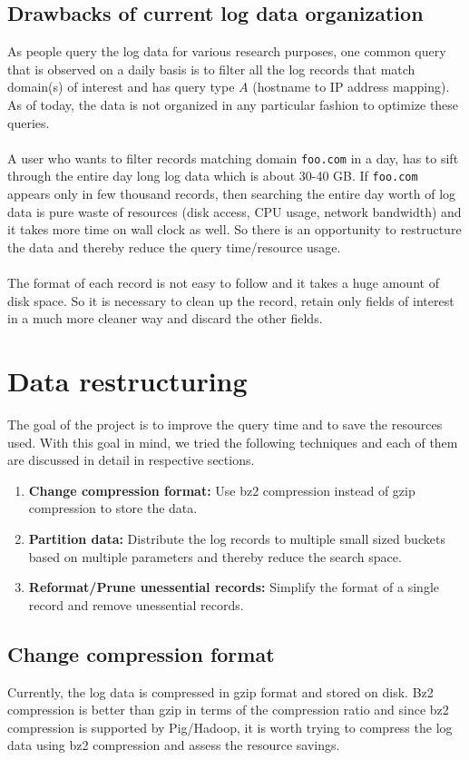\documentclass[11pt,a4paper]{article}
\newcommand{\resitem}[1]{\item #1 \vspace{-7pt}}
\begin{document}
\subsection{Drawbacks of current log data organization}
As people query the log data for various research purposes, one common query that is observed on a daily basis is to filter all the log records that match domain(s) of interest and has query type $A$ (hostname to IP address mapping). As of today, the data is not organized in any particular fashion to optimize these queries.
\\\\
A user who wants to filter records matching domain \texttt{foo.com} in a day, has to sift through the entire day long log data which is about 30-40 GB. If \texttt{foo.com} appears only in few thousand records, then searching the entire day worth of log data is pure waste of resources (disk access, CPU usage, network bandwidth) and it takes more time on wall clock as well. So there is an opportunity to restructure the data and thereby reduce the query time/resource usage.
\\\\
The format of each record is not easy to follow and it takes a huge amount of disk space. So it is necessary to clean up the record, retain only fields of interest in a much more cleaner way and discard the other fields.

\section {Data restructuring}
The goal of the project is to improve the query time and to save the resources used. With this goal in mind, we tried the following techniques and each of them are discussed in detail in respective sections.
\begin{enumerate}

	\resitem {\textbf{Change compression format:} Use bz2 compression instead of gzip compression to store the data.}    \resitem {\textbf{Partition data:} Distribute the log records to multiple small sized buckets based on multiple parameters and thereby reduce the search space.}
    \resitem {\textbf{Reformat/Prune unessential records:} Simplify the format of a single record and remove unessential records.}
\end{enumerate}

\subsection{Change compression format}
Currently, the log data is compressed in gzip format and stored on disk. Bz2 compression is better than gzip in terms of the compression ratio and since bz2 compression is supported by Pig/Hadoop, it is worth trying to compress the log data using bz2 compression and assess the resource savings.
\end{document}
